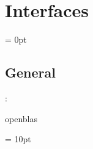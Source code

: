 
\section{Interfaces} 


\parskip = 0pt

\vspace{3mm} \subsection*{General}

: 

openblas
\vspace{2mm}

\vspace{5mm}\parskip = 10pt 
